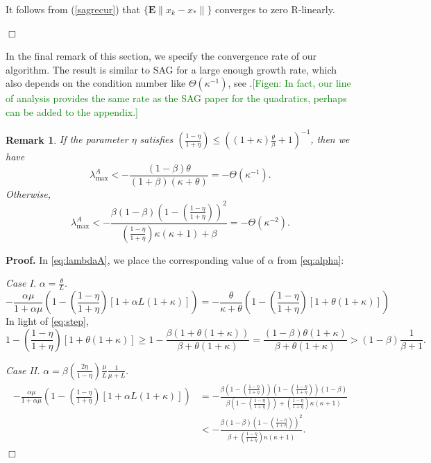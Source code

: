 \documentclass[11pt]{article}
\newtheorem{rem}[thm]{Remark}
\newcommand{\E}{\mathbf{E}}
\begin{document}
  It follows from (\ref{sagrecur}) that $\{\E\|x_k-x_\ast\|\}$  converges to zero R-linearly.
  
  \hspace*{\fill}$\Box$\medskip

In the final remark of this section, we specify the convergence rate of our algorithm. The result is similar to SAG for a large enough growth rate, which also depends on the condition number like $\Theta(\kappa^{-1})$, see \cite{roux2012stochastic}.\textcolor{green}{[Figen: In fact, our line of analysis provides the same rate as the SAG paper for the quadratics, perhaps can be added to the appendix.]}

\begin{rem}\label{lemma:order}
If the parameter $\eta$ satisfies ${\left(\frac{1-\eta}{1+\eta}\right)} \leq \left((1+\kappa)\frac{\theta}{\beta} + 1\right)^{-1}$, then we have 
\begin{equation}\label{eq:rate1}
\lambda_{\max}^A < -\frac{(1-\beta)\theta}{(1+\beta)(\kappa+\theta)} = -\Theta(\kappa^{-1}).   
\end{equation}
Otherwise, 
\begin{equation}\label{eq:rate2}
 \lambda_{\max}^A < -\frac{\beta(1-\beta)(1-{\left(\frac{1-\eta}{1+\eta}\right)})^2}{{\left(\frac{1-\eta}{1+\eta}\right)}\kappa(\kappa+1)+\beta} = -\Theta(\kappa^{-2}).
\end{equation}
\end{rem}

\noindent 
\textbf{Proof.} In \eqref{eq:lambdaA}, we place the corresponding value of $\alpha$ from \eqref{eq:alpha}:



\textit{Case I.} $\alpha=\displaystyle\frac{\theta}{L}$. 
\[
 -\frac{\alpha\mu}{1+\alpha\mu}\left(1-{\left(\frac{1-\eta}{1+\eta}\right)}[1+\alpha L(1+\kappa)]\right) = -\frac{\theta}{\kappa+\theta}\left(1-{\left(\frac{1-\eta}{1+\eta}\right)}[1+\theta(1+\kappa)]\right)
\]
In light of \eqref{eq:step}, 
\[
 1-{\left(\frac{1-\eta}{1+\eta}\right)}[1+\theta(1+\kappa)]\geq 1-\frac{\beta(1+\theta(1+\kappa))}{\beta+\theta(1+\kappa)} = \frac{(1-\beta)\theta(1+\kappa)}{\beta+\theta(1+\kappa)}> (1-\beta)\frac{1}{\beta+1}.
\]



\textit{Case II.} $\alpha = \displaystyle\beta\left(\frac{2 \eta}{1-\eta} \right)\frac{\mu}{L}\frac{1}{\mu+L}$.
\begin{align*}
 -\frac{\alpha\mu}{1+\alpha\mu}\left(1-{\left(\frac{1-\eta}{1+\eta}\right)}[1+\alpha L(1+\kappa)]\right) &= -\frac{\beta(1-{\left(\frac{1-\eta}{1+\eta}\right)})(1-{\left(\frac{1-\eta}{1+\eta}\right)})(1-\beta)}{\beta(1-{\left(\frac{1-\eta}{1+\eta}\right)})+{\left(\frac{1-\eta}{1+\eta}\right)}\kappa(\kappa+1)}\\
 & < -\frac{\beta(1-\beta)(1-{\left(\frac{1-\eta}{1+\eta}\right)})^2}{\beta+{\left(\frac{1-\eta}{1+\eta}\right)}\kappa(\kappa+1)}.
\end{align*} 
\hspace*{\fill}$\Box$\medskip
\end{document}
